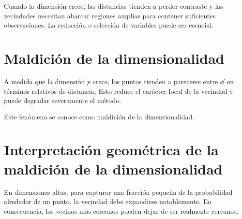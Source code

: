 \documentclass[
  spanish,
  10.5pt,
  letterpaper,
  DIV=11,
  numbers=noendperiod,
  oneside,
  open=any]{scrreprt}
\theoremstyle{definition}
\theoremstyle{definition}
\theoremstyle{plain}
\theoremstyle{remark}
\begin{document}
\begin{tcolorbox}[enhanced jigsaw, arc=.35mm, bottomrule=.15mm, bottomtitle=1mm, breakable, colback=white, colbacktitle=quarto-callout-warning-color!10!white, colframe=quarto-callout-warning-color-frame, coltitle=black, left=2mm, leftrule=.75mm, opacityback=0, opacitybacktitle=0.6, rightrule=.15mm, title=\textcolor{quarto-callout-warning-color}{\faExclamationTriangle}\hspace{0.5em}{Dimensión alta}, titlerule=0mm, toprule=.15mm, toptitle=1mm]

Cuando la dimensión crece, las distancias tienden a perder contraste y
las vecindades necesitan abarcar regiones amplias para contener
suficientes observaciones. La reducción o selección de variables puede
ser esencial.

\end{tcolorbox}

\section*{\texorpdfstring{Maldición de la
dimensionalidad}{Maldición de la dimensionalidad}}\label{maldiciuxf3n-de-la-dimensionalidad}


A medida que la dimensión \(p\) crece, los puntos tienden a parecerse
entre sí en términos relativos de distancia. Esto reduce el carácter
local de la vecindad y puede degradar severamente el método.

Este fenómeno se conoce como maldición de la dimensionalidad.

\section*{Interpretación geométrica de la maldición de la
dimensionalidad}\label{interpretaciuxf3n-geomuxe9trica-de-la-maldiciuxf3n-de-la-dimensionalidad}


En dimensiones altas, para capturar una fracción pequeña de la
probabilidad alrededor de un punto, la vecindad debe expandirse
notablemente. En consecuencia, los vecinos más cercanos pueden dejar de
ser realmente cercanos.
\end{document}

